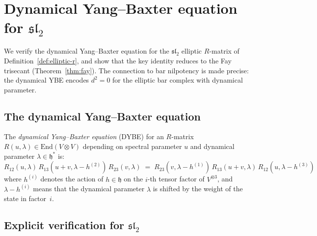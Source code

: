 \section{\texorpdfstring{Dynamical Yang--Baxter equation for $\mathfrak{sl}_2$}{Dynamical Yang--Baxter equation for sl2}}
\label{sec:dynamical-ybe-sl2}

We verify the dynamical Yang--Baxter equation for the
$\mathfrak{sl}_2$ elliptic $R$-matrix of
Definition~\ref{def:elliptic-r}, and show that the key identity
reduces to the Fay trisecant (Theorem~\ref{thm:fay}). The
connection to bar nilpotency is made precise: the dynamical YBE
encodes $d^2 = 0$ for the elliptic bar complex with dynamical
parameter.

\subsection{The dynamical Yang--Baxter equation}
\label{subsec:dybe-statement}

\begin{definition}
\label{def:dybe}
The \emph{dynamical Yang--Baxter equation} (DYBE) for an
$R$-matrix $R(u, \lambda) \in \mathrm{End}(V \otimes V)$
depending on spectral parameter $u$ and dynamical parameter
$\lambda \in \mathfrak{h}^*$ is:
\begin{equation}\label{eq:dybe}
R_{12}(u, \lambda)\,
R_{13}(u+v, \lambda - h^{(2)})\,
R_{23}(v, \lambda)
\;=\;
R_{23}(v, \lambda - h^{(1)})\,
R_{13}(u+v, \lambda)\,
R_{12}(u, \lambda - h^{(3)})
\end{equation}
where $h^{(i)}$ denotes the action of $h \in \mathfrak{h}$ on
the $i$-th tensor factor of $V^{\otimes 3}$, and $\lambda - h^{(i)}$
means that the dynamical parameter $\lambda$ is shifted by the
weight of the state in factor~$i$.
\end{definition}

\subsection{\texorpdfstring{Explicit verification for $\mathfrak{sl}_2$}{Explicit verification for sl2}}
\label{subsec:dybe-sl2-verification}

